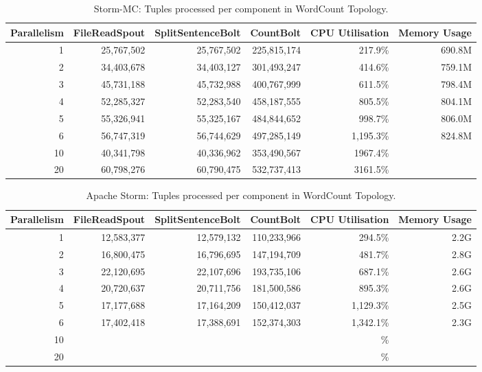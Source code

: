 \begin{table}[!htb]
\begin{adjustwidth}{-0.5in}{-0.5in}
\centering
\small
\begin{tabular}{@{}rrrrrr@{}}
    {Parallelism} & {FileReadSpout} & {SplitSentenceBolt} & {CountBolt} & {CPU Utilisation} & {Memory Usage} \\ \toprule
    1 & {25,767,502} & {25,767,502} & {225,815,174} & {217.9\%} & {690.8M} \\
    2 & {34,403,678} & {34,403,127} & {301,493,247} & {414.6\%} & {759.1M} \\
    3 & {45,731,188} & {45,732,988} & {400,767,999} & {611.5\%} & {798.4M} \\
    4 & {52,285,327} & {52,283,540} & {458,187,555} & {805.5\%} & {804.1M} \\
	5 & {55,326,941} & {55,325,167} & {484,844,652} & {998.7\%} & {806.0M} \\
	6 & {56,747,319} & {56,744,629} & {497,285,149} & {1,195.3\%} & {824.8M} \\
	10 & {40,341,798} & {40,336,962} & {353,490,567} & {1967.4\%} & {} \\
	20 & {60,798,276} & {60,790,475} & {532,737,413} & {3161.5\%} & {} \\
\end{tabular}
\caption{Storm-MC: Tuples processed per component in WordCount Topology.}
\label{table:storm_mc_wordcount}
\end{adjustwidth}
\end{table}

\begin{table}[!htb]
\begin{adjustwidth}{-0.5in}{-0.5in}
\centering
\small
\begin{tabular}{@{}rrrrrr@{}}
    {Parallelism} & {FileReadSpout} & {SplitSentenceBolt} & {CountBolt} & {CPU Utilisation} & {Memory Usage} \\ \toprule
    1 & {12,583,377} & {12,579,132} & {110,233,966} & {294.5\%} & {2.2G} \\
    2 & {16,800,475} & {16,796,695} & {147,194,709} & {481.7\%} & {2.8G} \\
    3 & {22,120,695} & {22,107,696} & {193,735,106} & {687.1\%} & {2.6G} \\
    4 & {20,720,637} & {20,711,756} & {181,500,586} & {895.3\%} & {2.6G} \\
	5 & {17,177,688} & {17,164,209} & {150,412,037} & {1,129.3\%} & {2.5G} \\
	6 & {17,402,418} & {17,388,691} & {152,374,303} & {1,342.1\%} & {2.3G} \\
	10 & {} & {} & {} & {\%} & {} \\
	20 & {} & {} & {} & {\%} & {} \\
\end{tabular}
\caption{Apache Storm: Tuples processed per component in WordCount Topology.}
\label{table:storm_wordcount}
\end{adjustwidth}
\end{table}

